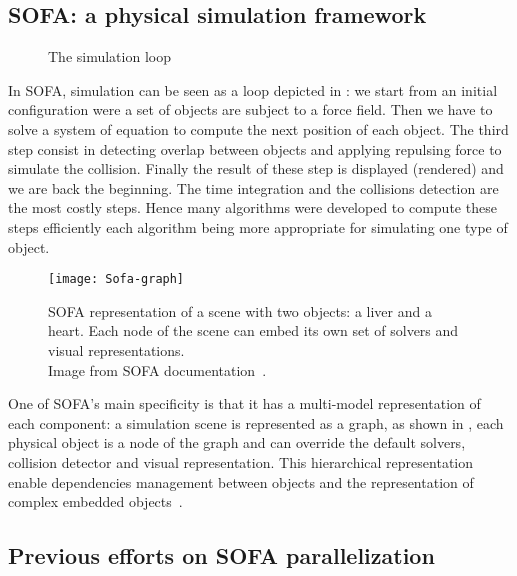 \subsection{SOFA: a physical simulation framework}

\begin{figure}[htb]
    \centering
    
    \caption[The simulation loop]{The simulation loop}
    \label{fig:simu-pipeline}
\end{figure}

In \gls{SOFA}, simulation can be seen as a loop depicted in : we start from an initial configuration were a set of objects are subject to a force field.
Then we have to solve a system of equation to compute the next position of each object.
The third step consist in detecting overlap between objects and applying repulsing force to simulate the collision.
Finally the result of these step is displayed (rendered) and we are back the beginning.
The time integration and the collisions detection are the most costly steps.
Hence many algorithms  were developed to compute these steps efficiently each algorithm being more appropriate for simulating one type of object.

\begin{figure}[htb]
    \centering
    \texttt{[image: Sofa-graph]}
    \caption[Example of SOFA scene graph]{SOFA representation of a scene with two objects: a liver and a
        heart. Each node of the scene can embed its own set of solvers and
        visual representations.\\
        Image from SOFA documentation~\cite{SOFA16Sofa}.}
    \label{fig:sofa-tree}
\end{figure}

One of \gls{SOFA}'s main specificity is that it has a multi-model representation of each component: a simulation scene is represented as a graph, as shown in , each physical object is a node of the graph and can override the default solvers, collision detector and visual representation.
This hierarchical representation enable dependencies management between objects and the representation of complex embedded objects~\cite{Nesme09Preserving,Faure11Sparse}.

\subsection{Previous efforts on SOFA parallelization}

